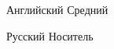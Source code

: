 
\begin{cvskills}

  \cvskill
    {Английский} %
    {Средний} %

  \cvskill
    {Русский} %
    {Носитель} %
    
\end{cvskills}
